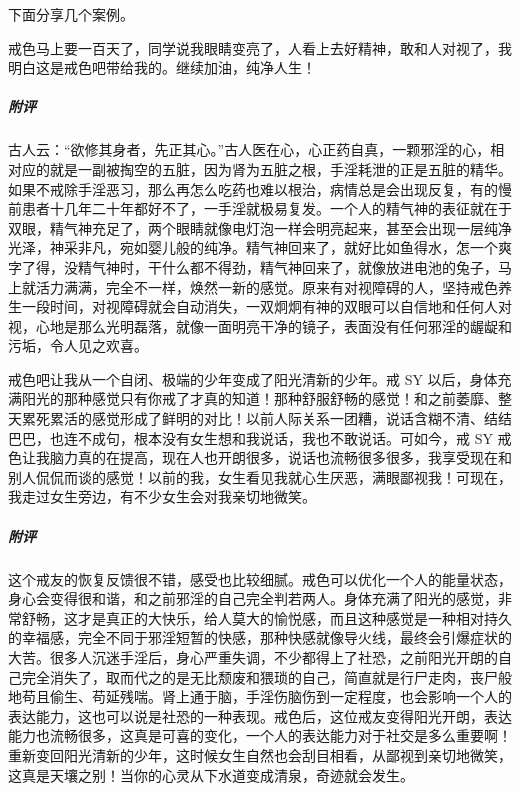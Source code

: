 下面分享几个案例。

\begin{case}
    戒色马上要一百天了，同学说我眼睛变亮了，人看上去好精神，敢和人对视了，我明白这是戒色吧带给我的。继续加油，纯净人生！
    \subparagraph{附评} 古人云：“欲修其身者，先正其心。”古人医在心，心正药自真，一颗邪淫的心，相对应的就是一副被掏空的五脏，因为肾为五脏之根，手淫耗泄的正是五脏的精华。如果不戒除手淫恶习，那么再怎么吃药也难以根治，病情总是会出现反复，有的慢前患者十几年二十年都好不了，一手淫就极易复发。一个人的精气神的表征就在于双眼，精气神充足了，两个眼睛就像电灯泡一样会明亮起来，甚至会出现一层纯净光泽，神采非凡，宛如婴儿般的纯净。精气神回来了，就好比如鱼得水，怎一个爽字了得，没精气神时，干什么都不得劲，精气神回来了，就像放进电池的兔子，马上就活力满满，完全不一样，焕然一新的感觉。原来有对视障碍的人，坚持戒色养生一段时间，对视障碍就会自动消失，一双炯炯有神的双眼可以自信地和任何人对视，心地是那么光明磊落，就像一面明亮干净的镜子，表面没有任何邪淫的龌龊和污垢，令人见之欢喜。
\end{case}

\begin{case}
    戒色吧让我从一个自闭、极端的少年变成了阳光清新的少年。戒 SY 以后，身体充满阳光的那种感觉只有你戒了才真的知道！那种舒服舒畅的感觉！和之前萎靡、整天累死累活的感觉形成了鲜明的对比！以前人际关系一团糟，说话含糊不清、结结巴巴，也连不成句，根本没有女生想和我说话，我也不敢说话。可如今，戒 SY 戒色让我脑力真的在提高，现在人也开朗很多，说话也流畅很多很多，我享受现在和别人侃侃而谈的感觉！以前的我，女生看见我就心生厌恶，满眼鄙视我！可现在，我走过女生旁边，有不少女生会对我亲切地微笑。
    \subparagraph{附评} 这个戒友的恢复反馈很不错，感受也比较细腻。戒色可以优化一个人的能量状态，身心会变得很和谐，和之前邪淫的自己完全判若两人。身体充满了阳光的感觉，非常舒畅，这才是真正的大快乐，给人莫大的愉悦感，而且这种感觉是一种相对持久的幸福感，完全不同于邪淫短暂的快感，那种快感就像导火线，最终会引爆症状的大苦。很多人沉迷手淫后，身心严重失调，不少都得上了社恐，之前阳光开朗的自己完全消失了，取而代之的是无比颓废和猥琐的自己，简直就是行尸走肉，丧尸般地苟且偷生、苟延残喘。肾上通于脑，手淫伤脑伤到一定程度，也会影响一个人的表达能力，这也可以说是社恐的一种表现。戒色后，这位戒友变得阳光开朗，表达能力也流畅很多，这真是可喜的变化，一个人的表达能力对于社交是多么重要啊！重新变回阳光清新的少年，这时候女生自然也会刮目相看，从鄙视到亲切地微笑，这真是天壤之别！当你的心灵从下水道变成清泉，奇迹就会发生。
\end{case}

